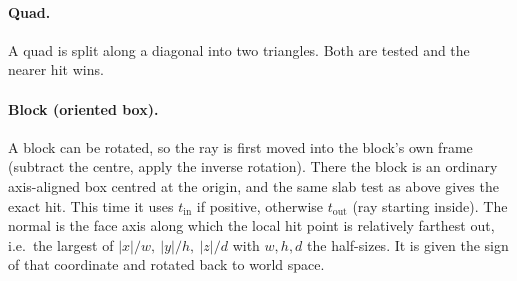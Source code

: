 \documentclass[11pt,a4paper]{article}
\begin{document}
\paragraph{Quad.} A quad is split along a diagonal into two triangles. Both are
tested and the nearer hit wins.

\paragraph{Block (oriented box).} A block can be rotated, so the ray is first
moved into the block's own frame (subtract the centre, apply the inverse
rotation). There the block is an ordinary axis-aligned box centred at the
origin, and the same slab test as above gives the exact hit. This time it uses
$t_{\text{in}}$ if positive, otherwise $t_{\text{out}}$ (ray starting inside).
The normal is the face axis along which the local hit point is relatively
farthest out, i.e.\ the largest of $|x|/w,\ |y|/h,\ |z|/d$ with $w,h,d$ the
half-sizes. It is given the sign of that coordinate and rotated back to world
space.
\end{document}
